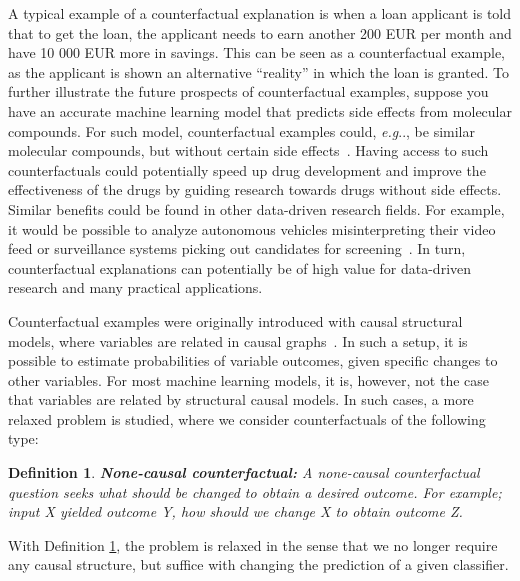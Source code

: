 \documentclass[11pt,a4paper,twoside,openright,final]{memoir}
\makeatletter
\newtheorem{definition}{Definition}
\DeclareRobustCommand\onedot{\futurelet\@let@token\@onedot}
\def\@onedot{\ifx\@let@token.\else.\null\fi\xspace}
\def\eg{\emph{e.g}\onedot} \def\Eg{\emph{E.g}\onedot}
\makeatother
\begin{document}
A typical example of a counterfactual explanation is when a loan applicant is told that to get the loan, the applicant needs to earn another 200 EUR per month and have 10 000 EUR more in savings.
This can be seen as a counterfactual example, as the applicant is shown an alternative ``reality'' in which the loan is granted.
To further illustrate the future prospects of counterfactual examples, suppose you have an accurate machine learning model that predicts side effects from molecular compounds.
For such model, counterfactual examples could, \eg, be similar molecular compounds, but without certain side effects~\cite{carter2017using, moses}.
Having access to such counterfactuals could potentially speed up drug development and improve the effectiveness of the drugs by guiding research towards drugs without side effects.
Similar benefits could be found in other data-driven research fields.
For example, it would be possible to analyze autonomous vehicles misinterpreting their video feed or surveillance systems picking out candidates for screening~\cite{goyal19a}. 
In turn, counterfactual explanations can potentially be of high value for data-driven research and many practical applications. 

Counterfactual examples were originally introduced with causal structural models, where variables are related in causal graphs~\cite{pearl2015a}.
In such a setup, it is possible to estimate probabilities of variable outcomes, given specific changes to other variables.
For most machine learning models, it is, however, not the case that variables are related by structural causal models.
In such cases, a more relaxed problem is studied, where we consider counterfactuals of the following type: 
\begin{definition}\label{def:dl-counterfactual}
    \textbf{None-causal counterfactual:} A none-causal counterfactual question seeks what should be changed to obtain a desired outcome. For example; input X yielded outcome Y, how should we change X to obtain outcome Z. 
\end{definition}
With Definition \ref{def:dl-counterfactual}, the problem is relaxed in the sense that we no longer require any causal structure, but suffice with changing the prediction of a given classifier. 
\end{document}
